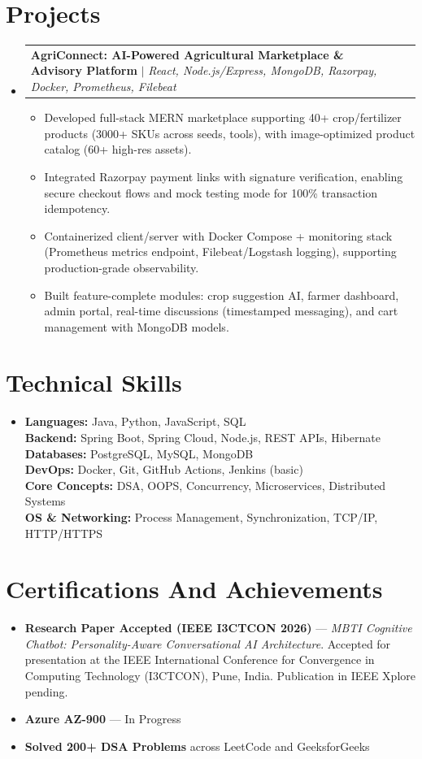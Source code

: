 \documentclass[letterpaper,11pt]{article}
\makeatletter
\newcommand{\resumeItem}[1]{
  \item\small{#1 \vspace{-3pt}}
}
\newcommand{\resumeProjectHeading}[2]{
    \item
    \begin{tabular*}{0.97\textwidth}{l@{\extracolsep{\fill}}r}
      \small#1 & #2 \\
    \end{tabular*}\vspace{-8pt}
}
\newcommand{\resumeSubHeadingListStart}{\begin{itemize}[leftmargin=0.12in, label={}]}
\newcommand{\resumeSubHeadingListEnd}{\end{itemize}}
\newcommand{\resumeItemListStart}{\begin{itemize}[leftmargin=0.2in]}
\newcommand{\resumeItemListEnd}{\end{itemize}\vspace{-8pt}}
\makeatother
\begin{document}
\section{Projects}
\resumeSubHeadingListStart

  \resumeProjectHeading
  {\textbf{AgriConnect: AI-Powered Agricultural Marketplace \& Advisory Platform}
  \href{https://github.com/aryankumar4848/AgriConnect}{\faIcon{external-link-alt}}
  $|$ \emph{React, Node.js/Express, MongoDB, Razorpay, Docker, Prometheus, Filebeat}}{}
  \resumeItemListStart
    \resumeItem{Developed full-stack MERN marketplace supporting 40+ crop/fertilizer products (3000+ SKUs across seeds, tools), with image-optimized product catalog (60+ high-res assets).}
    \resumeItem{Integrated Razorpay payment links with signature verification, enabling secure checkout flows and mock testing mode for 100\% transaction idempotency.}
    \resumeItem{Containerized client/server with Docker Compose + monitoring stack (Prometheus metrics endpoint, Filebeat/Logstash logging), supporting production-grade observability.}
    \resumeItem{Built feature-complete modules: crop suggestion AI, farmer dashboard, admin portal, real-time discussions (timestamped messaging), and cart management with MongoDB models.}
  \resumeItemListEnd

\resumeSubHeadingListEnd

\section{Technical Skills}
\resumeSubHeadingListStart
\resumeItem{
\textbf{Languages:} Java, Python, JavaScript, SQL \\
\textbf{Backend:} Spring Boot, Spring Cloud, Node.js, REST APIs, Hibernate \\
\textbf{Databases:} PostgreSQL, MySQL, MongoDB \\
\textbf{DevOps:} Docker, Git, GitHub Actions, Jenkins (basic) \\
\textbf{Core Concepts:} DSA, OOPS, Concurrency, Microservices, Distributed Systems \\
\textbf{OS \& Networking:} Process Management, Synchronization, TCP/IP, HTTP/HTTPS
}
\resumeSubHeadingListEnd

\section{Certifications And Achievements}
\resumeSubHeadingListStart

\resumeItem{
\textbf{Research Paper Accepted (IEEE I3CTCON 2026)} — \textit{MBTI Cognitive Chatbot: Personality-Aware Conversational AI Architecture}. 
Accepted for presentation at the IEEE International Conference for Convergence in Computing Technology (I3CTCON), Pune, India. Publication in IEEE Xplore pending.
}

\resumeItem{
\textbf{Azure AZ-900} — In Progress
}

\resumeItem{
\textbf{Solved 200+ DSA Problems} across LeetCode and GeeksforGeeks
}

\resumeSubHeadingListEnd
\end{document}
